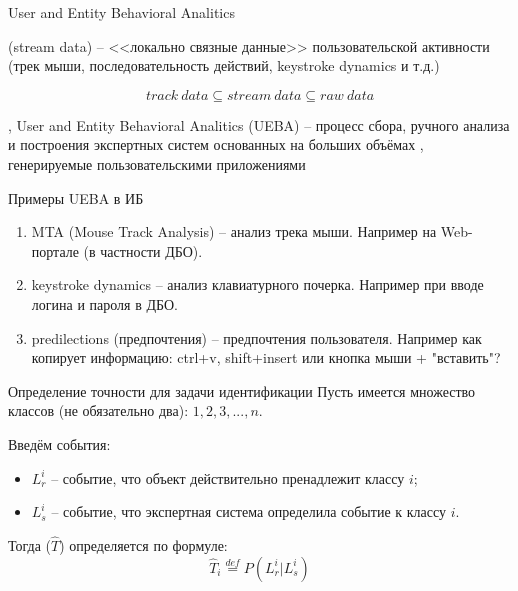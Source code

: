 \begin{frame}{User and Entity Behavioral Analitics}

	 (stream data) -- 
	<<локально связные данные>> пользовательской активности
	(трек мыши, последовательность действий, keystroke dynamics и т.д.)
	
	\begin{equation*}
	track~data \subseteq stream~data \subseteq raw~data
	\end{equation*}
	
	, User and Entity Behavioral Analitics (UEBA) --
	процесс сбора, ручного анализа и построения экспертных систем
	основанных на больших объёмах , генерируемые пользовательскими приложениями
\end{frame}

\begin{frame}{Примеры UEBA в ИБ}
	\begin{enumerate}
		\item MTA (Mouse Track Analysis) --
		анализ трека мыши.
		Например на Web-портале (в частности ДБО).
		\item keystroke dynamics --
		анализ клавиатурного почерка.
		Например при вводе логина и пароля в ДБО.
		\item predilections (предпочтения) --
		предпочтения пользователя. 
		Например как копирует информацию: ctrl+v, shift+insert или кнопка мыши + "вставить"?
	\end{enumerate}
\end{frame}

\begin{frame}{Определение точности для задачи идентификации}
	\small
	Пусть имеется множество классов (не обязательно два): $1, 2, 3, ..., n$.
	
	Введём события:
	\begin{itemize}
		\item $L_r^i$ -- событие, что объект действительно пренадлежит классу $i$;
		\item $L_s^i$ -- событие, что экспертная система определила событие к классу $i$.
	\end{itemize}
	
	Тогда  ($\hat T$)
	определяется по формуле:
	\begin{equation}
	\hat T_i \stackrel{def}{=} P (L_r^i | L_s^i)
	\end{equation}
\end{frame}

